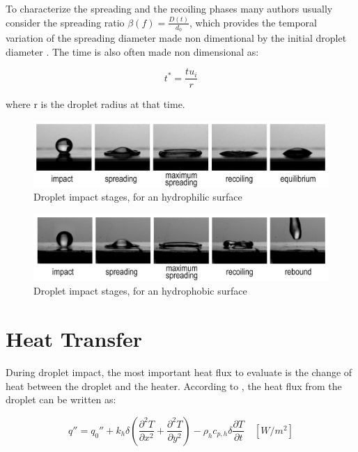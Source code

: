 \par To characterize the spreading and the recoiling phases many authors usually consider the spreading ratio $\beta(f) =\frac{D(t)}{d_0}$, which provides the temporal variation of the spreading diameter made non dimentional by the initial droplet diameter \cite{rein1993phenomena}. The time is also often made non dimensional as:

\begin{equation}\label{eq:rein}
t^*=\frac{t u_i}{r}
\end{equation}

where r is the droplet radius at that time.

\begin{figure}[h]
\centering
\includegraphics[width=0.9\linewidth]{Figures/2.Chapter/droplet.png}
\caption{Droplet impact stages, for an hydrophilic surface}
\label{fig:droplet}
\end{figure}

\begin{figure}[h]
\centering
\includegraphics[width=0.9\linewidth]{Figures/2.Chapter/droplethf.png}
\caption{Droplet impact stages, for an hydrophobic surface}
\label{fig:droplethf}
\end{figure}

\section{Heat Transfer}
\label{sec:heat}

\par During droplet impact, the most important heat flux to evaluate is the change of heat between the droplet and the heater. According to \cite{sielaff2014experimental}, the heat flux from the droplet can be written as:

\begin{equation}\label{eq:heat}
q''=q_0''+k_h \delta (\frac{{\partial}^2 T}{\partial x^2}+\frac{{\partial}^2 T}{\partial y^2})-\rho_h c_{p,h} \delta \frac{{\partial} T}{\partial t} \quad [W/m^2]
\end{equation}

